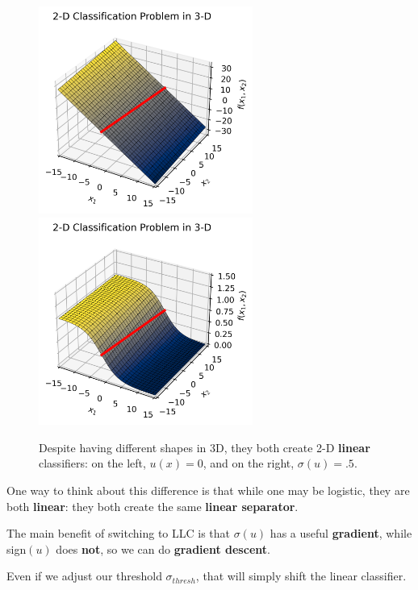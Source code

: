         \begin{figure}[H]
            \includegraphics[width=70mm,scale=0.5]{images/classification_images/2d_classification_in_3d_plane.png}
            \includegraphics[width=70mm,scale=0.5]{images/classification_images/2d_classification_in_3d_sigmoid.png}
            
            \caption*{Despite having different shapes in 3D, they both create 2-D \textbf{linear} classifiers: on the left, $u(x)=0$, and on the right, $\sigma(u)=.5$.}
        \end{figure}
        
        One way to think about this difference is that while one may be logistic, they are both \textbf{linear}: they both create the same \textbf{linear separator}.
        
        The main benefit of switching to LLC is that $\sigma(u)$ has a useful \textbf{gradient}, while sign$(u)$ does \textbf{not}, so we can do \textbf{gradient descent}.
            
        Even if we adjust our threshold $\sigma_{thresh}$, that will simply shift the linear classifier.\\
        
